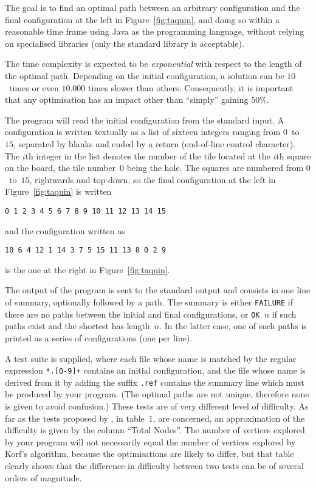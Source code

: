 \documentclass[11pt,a4paper]{article}
\begin{document}
The goal is to find an optimal path between an arbitrary configuration
and the final configuration at the left in Figure~\ref{fig:taquin},
and doing so within a reasonable time frame using \textsf{Java} as the
programming language, without relying on specialised libraries (only
the standard library is acceptable).

The time complexity is expected to be \emph{exponential} with respect
to the length of the optimal path. Depending on the initial
configuration, a solution can be \(10\)~times or even \(10.000\) times
slower than others. Consequently, it is important that any
optimisation has an impact other than ``simply'' gaining \(50\%\).

The program will read the initial configuration from the standard
input. A configuration is written textually as a list of sixteen
integers ranging from \(0\)~to~\(15\), separated by blanks and ended
by a return (end\hyp{}of\hyp{}line control character). The \(i\)th
integer in the list denotes the number of the tile located at the
\(i\)th square on the board, the tile number~\(0\) being the hole. The squares are numbered from \(0\)~to~\(15\), rightwards and top\hyp{}down, so the final configuration at the left in Figure~\ref{fig:taquin} is written
\begin{verbatim}
0 1 2 3 4 5 6 7 8 9 10 11 12 13 14 15
\end{verbatim}
and the configuration written as
\begin{verbatim}
10 6 4 12 1 14 3 7 5 15 11 13 8 0 2 9 
\end{verbatim}
is the one at the right in Figure~\ref{fig:taquin}.

The output of the program is sent to the standard output and consists
in one line of summary, optionally followed by a path. The summary is
either \texttt{FAILURE} if there are no paths between the initial and
final configurations, or \texttt{OK~\(n\)} if such paths exist and the
shortest has length~\(n\). In the latter case, one of such paths is
printed as a series of configurations (one per line).

A test suite is supplied, where each file whose name is matched by the
regular expression \verb/*.[0-9]+/ contains an initial configuration,
and the file whose name is derived from it by adding the suffix
\texttt{.ref} contains the summary line which must be produced by your
program. (The optimal paths are not unique, therefore none is given to
avoid confusion.) These tests are of very different level of
difficulty. As far as the tests proposed by \cite{korf-85}, in
table~\(1\), are concerned, an approximation of the difficulty is
given by the column ``Total Nodes''. The number of vertices explored
by your program will not necessarily equal the number of vertices
explored by Korf's algorithm, because the optimisations are likely to
differ, but that table clearly shows that the difference in difficulty
between two tests can be of several orders of magnitude.
\end{document}
